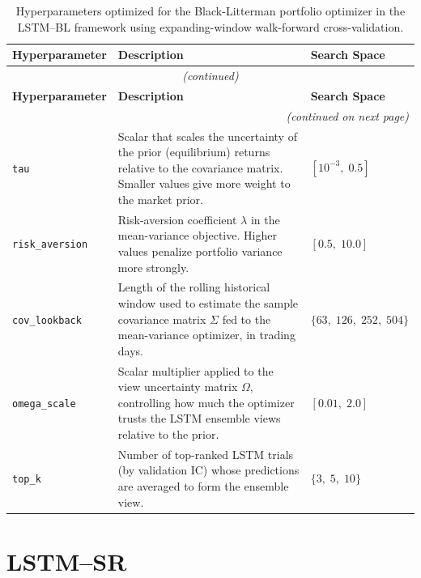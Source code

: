 \begin{longtable}{@{}p{3.7cm} p{7.5cm} p{3.3cm}@{}}
\caption{Hyperparameters optimized for the Black-Litterman portfolio optimizer in the LSTM--BL framework using expanding-window walk-forward cross-validation.}
\label{tab:hp_lstm_bl_bl} \\
\toprule
\textbf{Hyperparameter} & \textbf{Description} & \textbf{Search Space} \\
\midrule
\endfirsthead

\multicolumn{3}{c}{\footnotesize\textit{(continued)}} \\
\toprule
\textbf{Hyperparameter} & \textbf{Description} & \textbf{Search Space} \\
\midrule
\endhead

\bottomrule
\multicolumn{3}{r}{\footnotesize\textit{(continued on next page)}} \\
\endfoot

\bottomrule
\endlastfoot
 
\texttt{tau} & Scalar that scales the uncertainty of the prior (equilibrium) returns relative to the covariance matrix. Smaller values give more weight to the market prior. & $[10^{-3},\;0.5]$ \\[4pt]
 
\texttt{risk\_aversion} & Risk-aversion coefficient $\lambda$ in the mean-variance objective. Higher values penalize portfolio variance more strongly. & $[0.5,\;10.0]$ \\[4pt]
 
\texttt{cov\_lookback} & Length of the rolling historical window used to estimate the sample covariance matrix $\Sigma$ fed to the mean-variance optimizer, in trading days. & $\{63,\;126,\;252,\;504\}$ \\[4pt]

\texttt{omega\_scale} & Scalar multiplier applied to the view uncertainty matrix $\Omega$, controlling how much the optimizer trusts the LSTM ensemble views relative to the prior. & $[0.01,\;2.0]$ \\[4pt]

\texttt{top\_k} & Number of top-ranked LSTM trials (by validation IC) whose predictions are averaged to form the ensemble view. & $\{3,\;5,\;10\}$ \\
 
\bottomrule
\end{longtable}

\section{LSTM--SR}

